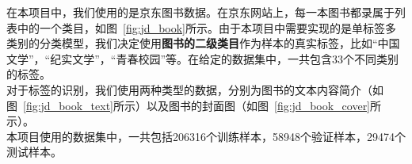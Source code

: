\noindent 在本项目中，我们使用的是京东图书数据。在京东网站上，每一本图书都录属于列表中的一个类目，如图~\ref{fig:jd_book}所示。由于本项目中需要实现的是单标签多类别的分类模型，我们决定使用\textbf{图书的二级类目}作为样本的真实标签，比如“中国文学”，“纪实文学”，“青春校园”等。在给定的数据集中，一共包含$33$个不同类别的标签。\\

\noindent 对于标签的识别，我们使用两种类型的数据，分别为图书的文本内容简介（如图~\ref{fig:jd_book_text}所示）以及图书的封面图（如图~\ref{fig:jd_book_cover}所示）。\\

\nooindent 本项目使用的数据集中，一共包括206316个训练样本，58948个验证样本，29474个测试样本。